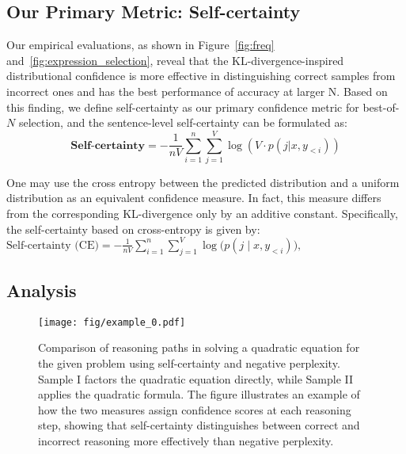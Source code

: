 \subsection{Our Primary Metric: Self-certainty}
Our empirical evaluations, as shown in Figure~\ref{fig:freq} and~\ref{fig:expression_selection}, reveal that the KL-divergence-inspired distributional confidence is more effective in distinguishing correct samples from incorrect ones and has the best performance of accuracy at larger N. Based on this finding, we define self-certainty as our primary confidence metric for best-of-\(N\) selection, and the sentence-level self-certainty can be formulated as:
\begin{equation}
    \textbf{Self-certainty} = -\frac{1}{nV}\sum_{i=1}^n\sum_{j=1}^{V} \log\left(V\cdot p(j|x,y_{<i})\right) \nonumber
\end{equation}

One may use the cross entropy between the predicted distribution and a uniform distribution as an equivalent confidence measure. In fact, this measure differs from the corresponding KL-divergence only by an additive constant. Specifically, the self-certainty based on cross-entropy is given by:
$
\text{Self-certainty (CE)} = -\frac{1}{n V} \sum_{i=1}^{n} \sum_{j=1}^{V} \log \bigl( p(j\mid x, y_{<i}) \bigr),
$

\subsection{Analysis}

\begin{figure*}[t]
    \centering
    \texttt{[image: fig/example\_0.pdf]}
    \caption{Comparison of reasoning paths in solving a quadratic equation for the given problem using self-certainty and negative perplexity. Sample I factors the quadratic equation directly, while Sample II applies the quadratic formula. The figure illustrates an example of how the two measures assign confidence scores at each reasoning step, showing that self-certainty distinguishes between correct and incorrect reasoning more effectively than negative perplexity.}
    \label{fig:example0}
\end{figure*}


